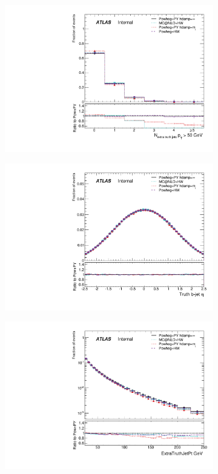 \begin{figure}
\centering
\begin{subfigure}[]{0.45\textwidth}
\includegraphics[width=\textwidth]{fig/MCComp/NTruthExtraJets50}
\end{subfigure}
\begin{subfigure}[]{0.45\textwidth}
\includegraphics[width=\textwidth]{fig/MCComp/TruthBJetEta.pdf}
\end{subfigure}
\begin{subfigure}[]{0.45\textwidth}
\includegraphics[width=\textwidth]{fig/MCComp/ExtraTruthJetPt.pdf}\end{subfigure}

\end{figure}
